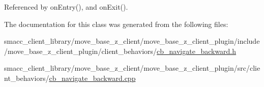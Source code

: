 Referenced by on\+Entry(), and on\+Exit().



The documentation for this class was generated from the following files\+:\begin{DoxyCompactItemize}
\item 
smacc\+\_\+client\+\_\+library/move\+\_\+base\+\_\+z\+\_\+client/move\+\_\+base\+\_\+z\+\_\+client\+\_\+plugin/include/move\+\_\+base\+\_\+z\+\_\+client\+\_\+plugin/client\+\_\+behaviors/\hyperlink{cb__navigate__backward_8h}{cb\+\_\+navigate\+\_\+backward.\+h}\item 
smacc\+\_\+client\+\_\+library/move\+\_\+base\+\_\+z\+\_\+client/move\+\_\+base\+\_\+z\+\_\+client\+\_\+plugin/src/client\+\_\+behaviors/\hyperlink{cb__navigate__backward_8cpp}{cb\+\_\+navigate\+\_\+backward.\+cpp}\end{DoxyCompactItemize}
